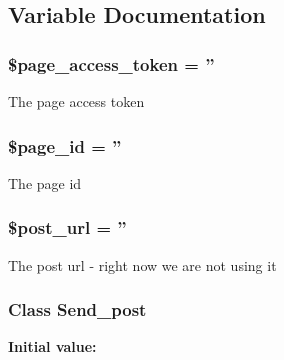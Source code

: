 \subsection{Variable Documentation}
\hypertarget{send__post_8php_a07610c5842cbcf4e9df3c0cc291ddc15}{
\subsubsection[{\$page\-\_\-access\-\_\-token}]{\setlength{\rightskip}{0pt plus 5cm}\$page\-\_\-access\-\_\-token = ''}}\label{send__post_8php_a07610c5842cbcf4e9df3c0cc291ddc15}
The page access token \hypertarget{send__post_8php_a0690e3943aac124dbebc20bfb9419da3}{
\subsubsection[{\$page\-\_\-id}]{\setlength{\rightskip}{0pt plus 5cm}\$page\-\_\-id = ''}}\label{send__post_8php_a0690e3943aac124dbebc20bfb9419da3}
The page id \hypertarget{send__post_8php_a1cce3b6b968431b6802980fa6f949d13}{
\subsubsection[{\$post\-\_\-url}]{\setlength{\rightskip}{0pt plus 5cm}\$post\-\_\-url = ''}}\label{send__post_8php_a1cce3b6b968431b6802980fa6f949d13}
The post url -\/ right now we are not using it \hypertarget{send__post_8php_a92ce328857a58124a9b4eedf35ae17b2}{
\subsubsection[{Send\-\_\-post}]{\setlength{\rightskip}{0pt plus 5cm}Class {\bf Send\-\_\-post}}}\label{send__post_8php_a92ce328857a58124a9b4eedf35ae17b2}
{\bfseries Initial value\-:}

